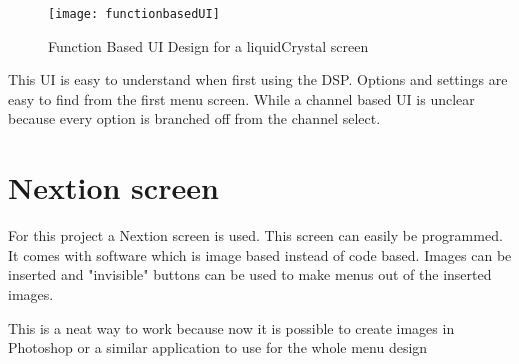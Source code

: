 \begin{figure}[ht]
    \texttt{[image: functionbasedUI]}
    \caption{Function Based UI Design for a liquidCrystal screen}
    \label{fig:functionbasedUI}
\end{figure}

This UI is easy to understand when first using the DSP. Options and settings are easy to find from the first menu screen. While a channel based UI is unclear because every option is branched off from the channel select.

\section{Nextion screen}

For this project a Nextion screen is used. This screen can easily be programmed. It comes with software which is image based instead of code based. Images can be inserted and "invisible" buttons can be used to make menus out of the inserted images.

This is a neat way to work because now it is possible to create images in Photoshop or a similar application to use for the whole menu design